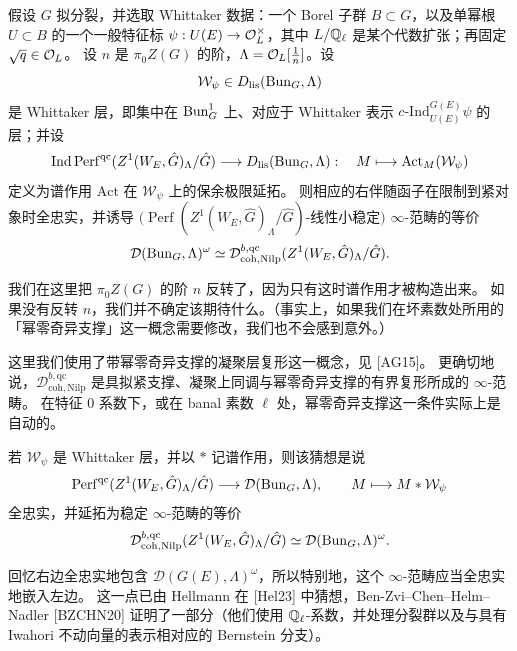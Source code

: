 \begin{conjecture}%
假设 $G$ 拟分裂，并选取 Whittaker 数据：一个 Borel 子群 $B\subset G$，以及单幂根 $U\subset B$ 的一个一般特征标 $\psi:U(E)\to\mathcal{O}_L^\times$，其中 $L/\mathbb{Q}_\ell$ 是某个代数扩张；再固定 $\sqrt q\in\mathcal{O}_L$。
设 $n$ 是 $\pi_0Z(G)$ 的阶，$\Lambda=\mathcal{O}_L[\tfrac1n]$。设
\[
  \mathcal{W}_\psi\in D_{\mathrm{lis}}(\mathrm{Bun}_G,\Lambda)
\]
是 Whittaker 层，即集中在 $\mathrm{Bun}_G^1$ 上、对应于 Whittaker 表示 $c\text{-}\mathrm{Ind}_{U(E)}^{G(E)}\psi$ 的层；并设
\[
  \operatorname{Ind}\operatorname{Perf}^{\mathrm{qc}}(Z^1(W_E,\hat G)_\Lambda/\hat G)\longrightarrow D_{\mathrm{lis}}(\mathrm{Bun}_G,\Lambda):\quad M\longmapsto \mathrm{Act}_M(\mathcal{W}_\psi)
\]
定义为谱作用 $\mathrm{Act}$ 在 $\mathcal{W}_\psi$ 上的保余极限延拓。
则相应的右伴随函子在限制到紧对象时全忠实，并诱导 $(\operatorname{Perf}(Z^1(W_E,\hat G)_\Lambda/\hat G)$-线性小稳定$)$ $\infty$-范畴的等价
\[
  \mathcal D(\mathrm{Bun}_G,\Lambda)^{\omega}\simeq \mathcal D^{b,\mathrm{qc}}_{\mathrm{coh},\mathrm{Nilp}}(Z^1(W_E,\hat G)_\Lambda/\hat G).
\]
\end{conjecture}

我们在这里把 $\pi_0Z(G)$ 的阶 $n$ 反转了，因为只有这时谱作用才被构造出来。
如果没有反转 $n$，我们并不确定该期待什么。（事实上，如果我们在坏素数处所用的「幂零奇异支撑」这一概念需要修改，我们也不会感到意外。）

这里我们使用了带幂零奇异支撑的凝聚层复形这一概念，见 [AG15]。
更确切地说，$\mathcal D^{b,\mathrm{qc}}_{\mathrm{coh},\mathrm{Nilp}}$ 是具拟紧支撑、凝聚上同调与幂零奇异支撑的有界复形所成的 $\infty$-范畴。
在特征 $0$ 系数下，或在 banal 素数 $\ell$ 处，幂零奇异支撑这一条件实际上是自动的。

若 $\mathcal{W}_\psi$ 是 Whittaker 层，并以 $*$ 记谱作用，则该猜想是说
\[
  \operatorname{Perf}^{\mathrm{qc}}(Z^1(W_E,\hat G)_\Lambda/\hat G)\longrightarrow \mathcal D(\mathrm{Bun}_G,\Lambda),\qquad
  M\longmapsto M*\mathcal{W}_\psi
\]
全忠实，并延拓为稳定 $\infty$-范畴的等价
\[
  \mathcal D^{b,\mathrm{qc}}_{\mathrm{coh},\mathrm{Nilp}}(Z^1(W_E,\hat G)_\Lambda/\hat G)\simeq \mathcal D(\mathrm{Bun}_G,\Lambda)^{\omega}.
\]

回忆右边全忠实地包含 $\mathcal D(G(E),\Lambda)^{\omega}$，所以特别地，这个 $\infty$-范畴应当全忠实地嵌入左边。
这一点已由 Hellmann 在 [Hel23] 中猜想，Ben-Zvi--Chen--Helm--Nadler [BZCHN20] 证明了一部分（他们使用 $\mathbb{Q}_\ell$-系数，并处理分裂群以及与具有 Iwahori 不动向量的表示相对应的 Bernstein 分支）。
